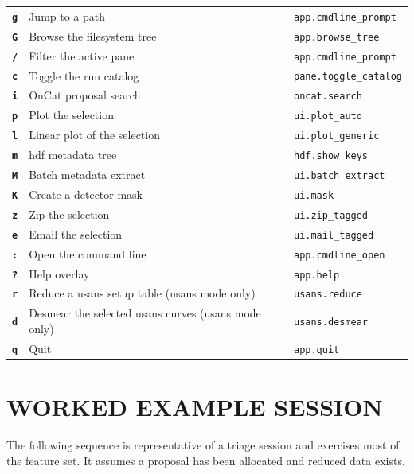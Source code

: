 \documentclass[tm]{ornltm}
\newcommand{\key}[1]{\textbf{\texttt{#1}}}
\begin{document}
\begin{small}
\begin{longtable}{p{} p{} p{}}
  \key{g} & Jump to a path & \texttt{app.cmdline\_prompt} \\
  \key{G} & Browse the filesystem tree & \texttt{app.browse\_tree} \\
  \key{/} & Filter the active pane & \texttt{app.cmdline\_prompt} \\
  \key{c} & Toggle the run catalog & \texttt{pane.toggle\_catalog} \\
  \key{i} & OnCat proposal search & \texttt{oncat.search} \\
  \key{p} & Plot the selection & \texttt{ui.plot\_auto} \\
  \key{l} & Linear plot of the selection & \texttt{ui.plot\_generic} \\
  \key{m} & \Ac{hdf} metadata tree & \texttt{hdf.show\_keys} \\
  \key{M} & Batch metadata extract & \texttt{ui.batch\_extract} \\
  \key{K} & Create a detector mask & \texttt{ui.mask} \\
  \key{z} & Zip the selection & \texttt{ui.zip\_tagged} \\
  \key{e} & Email the selection & \texttt{ui.mail\_tagged} \\
  \key{:} & Open the command line & \texttt{app.cmdline\_open} \\
  \key{?} & Help overlay & \texttt{app.help} \\
  \key{r} & Reduce a \ac{usans} setup table (\ac{usans} mode only) &
    \texttt{usans.reduce} \\
  \key{d} & Desmear the selected \ac{usans} curves (\ac{usans} mode only) &
    \texttt{usans.desmear} \\
  \key{q} & Quit & \texttt{app.quit} \\
\end{longtable}
\end{small}

\section{WORKED EXAMPLE SESSION}
\label{sec:appsession}

The following sequence is representative of a triage session and exercises most
of the feature set. It assumes a proposal has been allocated and reduced data
exists.
\end{document}
